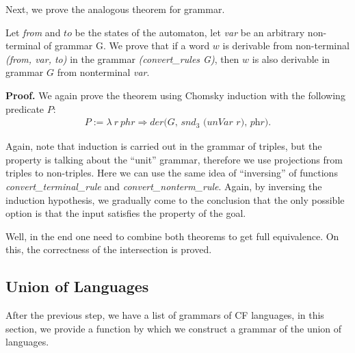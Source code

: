 Next, we prove the analogous theorem for grammar.

\begin{theorem}
	Let \textit{from} and $to$ be the states of the automaton, let \textit{var} be an arbitrary non-terminal of grammar G. We prove that if a word $w$ is derivable from non-terminal \textit{(from, var, to)} in the grammar \textit{(convert\_rules G)}, then $w$ is also derivable in grammar $G$ from nonterminal \textit{var}.
\end{theorem}

\textbf{Proof.} 
We again prove the theorem using Chomsky induction with the following predicate $P$:
\begin{align*}
P :=  \lambda \ r \ phr \Rightarrow \textit{der(G, $snd_3$ (unVar r), phr)}.
\end{align*}

Again, note that induction is carried out in the grammar of triples, but the property is talking about the ``unit'' grammar, therefore we use projections from triples to non-triples.
Here we can use the same idea of ``inversing'' of functions \textit{convert\_terminal\_rule} and \textit{convert\_nonterm\_rule}.
Again, by inversing the induction hypothesis, we gradually come to the conclusion that the only possible option is that the input satisfies the property of the goal. 

 


Well, in the end one need to combine both theorems to get full equivalence. On this, the correctness of the intersection is proved.

\subsection{Union of Languages}

After the previous step, we have a list of grammars of CF languages, in this section, we provide a function by which we construct a grammar of the union of languages.


